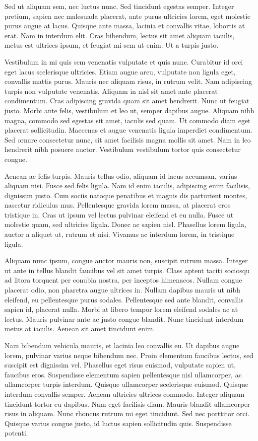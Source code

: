 \documentclass[2pt,a4paper,twoside ]{article}
\begin{document}
\begin{multicols}{2}
Sed ut aliquam sem, nec luctus nunc. Sed tincidunt egestas semper. Integer pretium, sapien nec malesuada placerat, ante purus ultricies lorem, eget molestie purus augue at lacus. Quisque ante massa, lacinia et convallis vitae, lobortis at erat. Nam in interdum elit. Cras bibendum, lectus sit amet aliquam iaculis, metus est ultrices ipsum, et feugiat mi sem ut enim. Ut a turpis justo.

Vestibulum in mi quis sem venenatis vulputate et quis nunc. Curabitur id orci eget lacus scelerisque ultricies. Etiam augue arcu, vulputate non ligula eget, convallis mattis purus. Mauris nec aliquam risus, in rutrum velit. Nam adipiscing turpis non vulputate venenatis. Aliquam in nisl sit amet ante placerat condimentum. Cras adipiscing gravida quam sit amet hendrerit. Nunc ut feugiat justo. Morbi ante felis, vestibulum et leo ut, semper dapibus augue. Aliquam nibh magna, commodo sed egestas sit amet, iaculis sed quam. Ut commodo diam eget placerat sollicitudin. Maecenas et augue venenatis ligula imperdiet condimentum. Sed ornare consectetur nunc, sit amet facilisis magna mollis sit amet. Nam in leo hendrerit nibh posuere auctor. Vestibulum vestibulum tortor quis consectetur congue.

Aenean ac felis turpis. Mauris tellus odio, aliquam id lacus accumsan, varius aliquam nisi. Fusce sed felis ligula. Nam id enim iaculis, adipiscing enim facilisis, dignissim justo. Cum sociis natoque penatibus et magnis dis parturient montes, nascetur ridiculus mus. Pellentesque gravida lorem massa, at placerat eros tristique in. Cras ut ipsum vel lectus pulvinar eleifend et eu nulla. Fusce ut molestie quam, sed ultricies ligula. Donec ac sapien nisl. Phasellus lorem ligula, auctor a aliquet ut, rutrum et nisi. Vivamus ac interdum lorem, in tristique ligula.

Aliquam nunc ipsum, congue auctor mauris non, suscipit rutrum massa. Integer ut ante in tellus blandit faucibus vel sit amet turpis. Class aptent taciti sociosqu ad litora torquent per conubia nostra, per inceptos himenaeos. Nullam congue placerat odio, non pharetra augue ultrices in. Nullam dapibus mauris ut nibh eleifend, eu pellentesque purus sodales. Pellentesque sed ante blandit, convallis sapien id, placerat nulla. Morbi at libero tempor lorem eleifend sodales ac at lectus. Mauris pulvinar ante ac justo congue blandit. Nunc tincidunt interdum metus at iaculis. Aenean sit amet tincidunt enim.

Nam bibendum vehicula mauris, et lacinia leo convallis eu. Ut dapibus augue lorem, pulvinar varius neque bibendum nec. Proin elementum faucibus lectus, sed suscipit est dignissim vel. Phasellus eget risus euismod, vulputate sapien ut, faucibus eros. Suspendisse elementum sapien pellentesque nisl ullamcorper, ac ullamcorper turpis interdum. Quisque ullamcorper scelerisque euismod. Quisque interdum convallis semper. Aenean ultricies ultrices commodo. Integer aliquam tincidunt tortor eu dapibus. Nam eget facilisis diam. Mauris blandit ullamcorper risus in aliquam. Nunc rhoncus rutrum mi eget tincidunt. Sed nec porttitor orci. Quisque varius congue justo, id luctus sapien sollicitudin quis. Suspendisse potenti.


\end{multicols}
\end{document}
